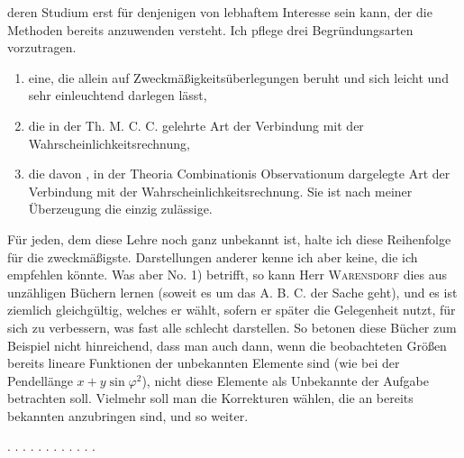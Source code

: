 deren Studium erst für denjenigen von lebhaftem Interesse sein kann, der
die Methoden bereits anzuwenden versteht. Ich pflege drei Begründungsarten
vorzutragen.

\begin{enumerate}
\item[1)] eine, die allein auf Zweckmäßigkeitsüberlegungen beruht und sich leicht und sehr
einleuchtend darlegen lässt,
\item[2)] die in der Th. M. C. C. gelehrte Art der Verbindung mit der
Wahrscheinlichkeitsrechnung,
\item[3)] die davon , in der Theoria Combinationis
Observationum dargelegte Art der Verbindung mit der Wahrscheinlichkeitsrechnung.
Sie ist nach meiner Überzeugung die einzig
zulässige.
\end{enumerate}

Für jeden, dem diese Lehre noch ganz unbekannt ist, halte ich diese
Reihenfolge für die zweckmäßigste. Darstellungen anderer kenne ich aber
keine, die ich empfehlen könnte. Was aber No. 1) betrifft, so kann Herr
\textsc{Warensdorf} dies aus unzähligen Büchern lernen (soweit es um das A. B. C. der Sache
geht), und es ist ziemlich gleichgültig, welches er wählt, sofern er später die Gelegenheit nutzt,
für sich zu verbessern, was fast alle schlecht darstellen.
So betonen diese Bücher zum Beispiel nicht hinreichend,
dass man auch dann, wenn die beobachteten Größen bereits lineare
Funktionen der unbekannten Elemente sind (wie bei der Pendellänge
$x+y\sin\varphi^2$), nicht diese Elemente als Unbekannte der Aufgabe betrachten soll.
Vielmehr soll man die Korrekturen wählen, die an bereits bekannten
 anzubringen sind, und so weiter.

. . . . . . . . . . . .
